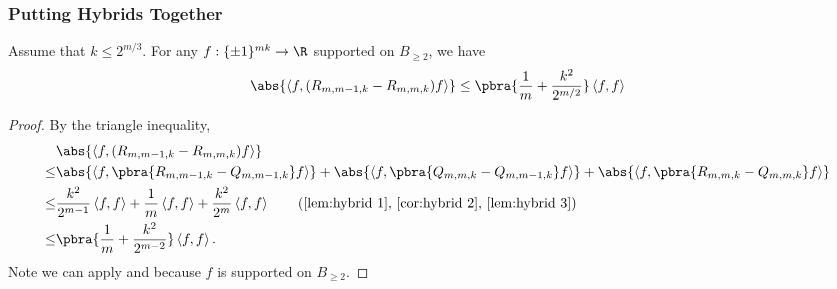 \subsubsection{Putting Hybrids Together}
\begin{proposition}\label{prop:B>=2 square term}
    Assume that $k\leq 2^{m/3}$. For any $f:\{\pm1\}^{mk}\to\R$ supported on $B_{\geq 2}$, we have
    \begin{align*}
        \abs{\left\langle f,(R_{m,m-1,k}-R_{m,m,k})f\right\rangle} \leq \pbra{\frac1m+\frac{k^2}{2^{m/2}}}\left\langle f,f\right\rangle
    \end{align*}
\end{proposition}
\begin{proof}
    By the triangle inequality,
    \begin{align*}
        &\abs{\left\langle f,(R_{m,m-1,k}-R_{m,m,k})f\right\rangle} \\
        \leq& \abs{\left\langle f,\pbra{R_{m,m-1,k}-Q_{m,m-1,k}}f\right\rangle}+ \abs{\left\langle f,\pbra{Q_{m,m,k}-Q_{m,m-1,k}}f\right\rangle}+\abs{\left\langle f,\pbra{R_{m,m,k}-Q_{m,m,k}}f\right\rangle}\\
        \leq & \frac{k^2}{2^{m-1}}\left\langle f,f\right\rangle+\frac1m\left\langle f,f\right\rangle+\frac{k^2}{2^{m}}\left\langle f,f\right\rangle \tag{\Cref{lem:hybrid 1}, \Cref{cor:hybrid 2}, \Cref{lem:hybrid 3}}\\
        \leq  &\pbra{\frac1m+\frac{k^2}{2^{m-2}}}\left\langle f,f\right\rangle .
    \end{align*}
    Note we can apply  and  because $f$ is supported on $B_{\geq 2}$.
\end{proof}
